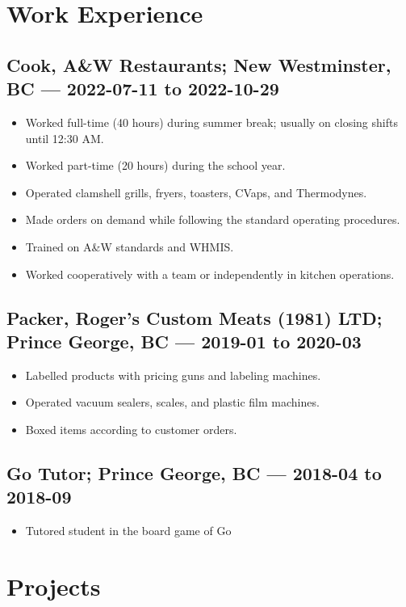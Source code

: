 \documentclass{article}
\begin{document}
\section*{Work Experience}

\subsection*{Cook, A\&W Restaurants; New Westminster, BC — 2022-07-11 to 2022-10-29}

\begin{itemize}
	\item Worked full-time (40 hours) during summer break; usually on closing shifts until 12:30 AM.
	\item Worked part-time (20 hours) during the school year.
	\item Operated clamshell grills, fryers, toasters, CVaps, and Thermodynes.
	\item Made orders on demand while following the standard operating procedures.
	\item Trained on A\&W standards and WHMIS.
	\item Worked cooperatively with a team or independently in kitchen operations.
\end{itemize}

\subsection*{Packer, Roger's Custom Meats (1981) LTD; Prince George, BC — 2019-01 to 2020-03}

\begin{itemize}
	\item Labelled products with pricing guns and labeling machines.
	\item Operated vacuum sealers, scales, and plastic film machines.
	\item Boxed items according to customer orders.
\end{itemize}

\subsection*{Go Tutor; Prince George, BC — 2018-04 to 2018-09}

\begin{itemize}
	\item Tutored student in the board game of Go
\end{itemize}

\section*{Projects}
\end{document}
